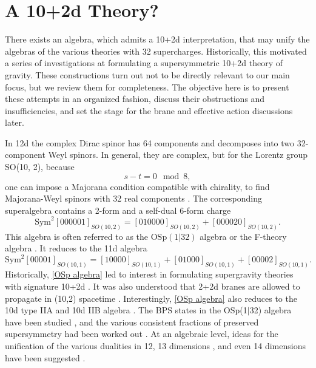 \section{A 10+2d Theory?}
There exists an algebra, which admits a 10+2d interpretation, that may unify the algebras of the various theories with 32 supercharges. 
Historically, this motivated a series of investigations at formulating a supersymmetric 10+2d theory of gravity.
These constructions turn out not to be directly relevant to our main focus, but we review them for completeness.
The objective here is to present these attempts in an organized fashion, discuss their obstructions and insufficiencies, and set the stage for the brane and effective action discussions later.

In 12d the complex Dirac spinor has 64 components and decomposes into two 32-component Weyl spinors.
In general, they are complex, but for the Lorentz group SO(10, 2), because
\begin{equation}
s-t=0\mod 8,
\end{equation}
one can impose a Majorana condition compatible with chirality, to find Majorana-Weyl spinors with 32 real components \cite{VanProeyen:1999ni}.
The corresponding superalgebra contains a 2-form and a self-dual 6-form charge
\cite{vanHolten:1982mx}
\begin{equation}
\text{Sym}^2[000001]_{SO(10, 2)} = [010000]_{SO(10, 2)} + [000020]_{SO(10, 2)}.
\label{OSp algebra}
\end{equation}
This algebra is often referred to as the $\mathrm{OSp}(1|32)$ algebra \cite{Bergshoeff:2000qu} or the F-theory algebra \cite{Hewson:1999tf}.
It reduces to the 11d algebra
\begin{equation}
\text{Sym}^2[00001]_{SO(10,1)} = [10000]_{SO(10,1)} + [01000]_{SO(10,1)} + [00002]_{SO(10,1)}.
\end{equation}
Historically, \eqref{OSp algebra} led to interest in formulating supergravity theories with signature 10+2d \cite{Castellani:1982ke}.
It was also understood that 2+2d branes are allowed to propagate in (10,2) spacetime \cite{Blencowe:1988sk}.
Interestingly, \eqref{OSp algebra} also reduces to the 10d type IIA and 10d IIB algebra \cite{Bergshoeff:2000qu,Bergshoeff:2000vg,Bergshoeff:2000vh}.
The BPS states in the OSp(1$|$32) algebra have been studied \cite{Ueno:1999xa}, and the various consistent fractions of preserved supersymmetry had been worked out \cite{Manvelyan:1998kx}.
At an algebraic level, ideas for the unification of the various dualities in 12, 13 dimensions \cite{Bars:1996dz,Bars:1996us,Bars:1996ab,Bars:1996hr}, and even 14 dimensions have been suggested \cite{Rudychev:1997ui,Bars:1997ug}.


